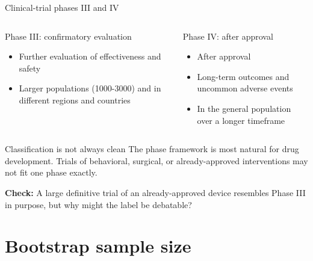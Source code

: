 \documentclass[aspectratio=169,11pt]{beamer}
\begin{document}
\begin{frame}{Clinical-trial phases III and IV}
  \begin{columns}[T]
      \begin{block}{Phase III: confirmatory evaluation}
        \begin{itemize}
          \item Further evaluation of effectiveness and safety
          \item Larger populations (1000-3000) and in different regions and countries
        \end{itemize}
      \end{block}
      \begin{block}{Phase IV: after approval}
        \begin{itemize}
          \item After approval
          \item Long-term outcomes and uncommon adverse events
          \item In the general population over a longer timeframe
        \end{itemize}
      \end{block}
  \end{columns}
  \vspace{0.6em}
  \begin{alertblock}{Classification is not always clean}
    The phase framework is most natural for drug development. Trials of behavioral,
    surgical, or already-approved interventions may not fit one phase exactly.
  \end{alertblock}
  \textbf{Check:} A large definitive trial of an already-approved device resembles
  Phase III in purpose, but why might the label be debatable?
\end{frame}

\section{Bootstrap sample size}
\end{document}
